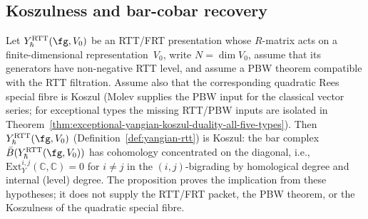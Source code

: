 \subsection{Koszulness and bar-cobar recovery}

\begin{proposition}\label{prop:yangian-koszul}
Let $Y_{\hbar}^{\mathrm{RTT}}(\fg,V_0)$ be an RTT/FRT presentation
whose $R$-matrix acts on a finite-dimensional representation~$V_0$,
write $N=\dim V_0$, assume that its generators have non-negative RTT
level, and assume a PBW theorem compatible with the RTT filtration.
Assume also that the corresponding quadratic Rees special fibre is Koszul
\textup{(}Molev supplies the PBW input for the classical vector
series; for exceptional types the missing RTT/PBW inputs are isolated in
Theorem~\ref{thm:exceptional-yangian-koszul-duality-all-five-types}\textup{)}.
Then $Y_{\hbar}^{\mathrm{RTT}}(\fg,V_0)$
(Definition~\ref{def:yangian-rtt}) is Koszul: the bar complex
$\bar{B}(Y_{\hbar}^{\mathrm{RTT}}(\fg,V_0))$ has cohomology concentrated on the
diagonal, i.e., $\mathrm{Ext}^{i,j}_{Y}(\mathbb{C}, \mathbb{C}) = 0$
for $i \neq j$ in the $(i, j)$-bigrading by homological degree and
internal (level) degree.
The proposition proves the implication from these hypotheses; it does
not supply the RTT/FRT packet, the PBW theorem, or the Koszulness of the
quadratic special fibre.
\end{proposition}


